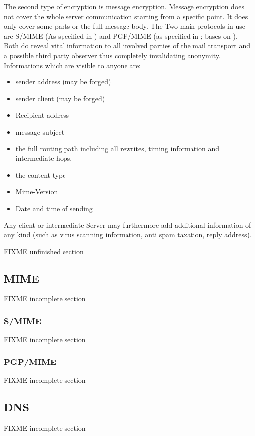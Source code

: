 The second type of encryption is message encryption. Message encryption does not cover the whole server communication starting from a specific point. It does only cover some parts or the full message body. The Two main protocols in use are S/MIME (As specified in \cite{RFC2311}) and PGP/MIME (as specified in \cite {RFC2015}; bases on \cite{RFC1847}). Both do reveal vital information to all involved parties of the mail transport and a possible third party observer thus completely invalidating anonymity. Informations which are visible to anyone are: 

\begin{itemize}
\item sender address (may be forged)
\item sender client (may be forged)
\item Recipient address
\item message subject 
\item the full routing path including all rewrites, timing information and intermediate hops.
\item the content type
\item Mime-Version
\item Date and time of sending
\end{itemize}

Any client or intermediate Server may furthermore add additional information of any kind (such as virus scanning information, anti spam taxation, reply address).

FIXME unfinished section

\subsection{MIME}
\cite{RFC2045}
\cite{RFC2046}
\cite{RFC2047}
\cite{RFC2048}
\cite{RFC2049}
FIXME incomplete section

\subsubsection{S/MIME}
\cite{RFC3851}
FIXME incomplete section

\subsubsection{PGP/MIME}
\cite{RFC2440}
FIXME incomplete section

\subsection{DNS}
\cite{RFC2929}
FIXME incomplete section

